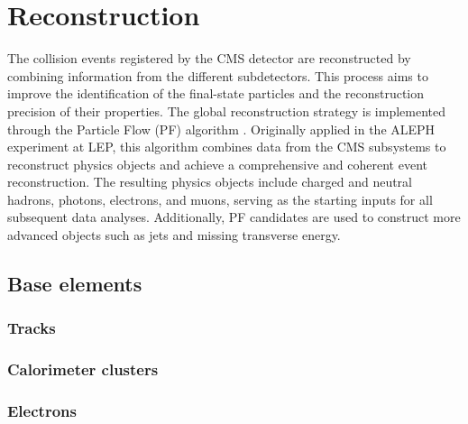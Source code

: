 \chapter{Reconstruction}

The collision events registered by the CMS detector are reconstructed by combining information from the different subdetectors.
This process aims to improve the identification of the final-state particles and the reconstruction precision of their properties.
The global reconstruction strategy is implemented through the Particle Flow (PF) algorithm \cite{ParticleFlow}.
Originally applied in the ALEPH experiment at LEP, this algorithm combines data from the CMS subsystems to reconstruct physics objects and achieve a comprehensive and coherent event reconstruction.
The resulting physics objects include charged and neutral hadrons, photons, electrons, and muons, serving as the starting inputs for all subsequent data analyses.
Additionally, PF candidates are used to construct more advanced objects such as jets and missing transverse energy.



\section{Base elements}
\subsection{Tracks}
\label{sec:tracks}


\subsection{Calorimeter clusters}


\subsection{Electrons}
\label{sec:eleReco}


